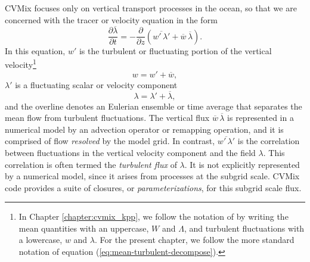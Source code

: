 CVMix focuses only on vertical transport processes in the ocean, so
that we are concerned with the tracer or velocity equation in the form
\begin{equation}
  \frac{\partial \overline{\lambda} }{\partial t}  = 
 - \frac{\partial}{\partial z}  \left( \overline{w' \, \lambda'} + \overline{w} \, \overline{\lambda} \right). 
\end{equation}
In this equation, $w'$ is the turbulent or fluctuating portion of the
vertical velocity\footnote{In Chapter \ref{chapter:cvmix_kpp}, we
  follow the notation of \cite{LargeKPP} by writing the mean
  quantities with an uppercase, $W$ and $\Lambda$, and turbulent
  fluctuations with a lowercase, $w$ and $\lambda$. For the present
  chapter, we follow the more standard notation of equation
  (\ref{eq:mean-turbulent-decompose}).}
\begin{equation}
 w = w' + \overline{w},
\label{eq:mean-turbulent-decompose-w}
\end{equation}
$\lambda'$ is a fluctuating scalar or velocity component
\begin{equation}
 \lambda = \lambda' + \overline{\lambda},
\label{eq:mean-turbulent-decompose-lambda}
\end{equation}
and the overline denotes an Eulerian ensemble or time average that
separates the mean flow from turbulent fluctuations.  The vertical
flux $\overline{w} \, \overline{\lambda}$ is represented in a
numerical model by an advection operator or remapping operation, and
it is comprised of flow {\it resolved} by the model grid.  In
contrast, $\overline{w' \, \lambda'}$ is the correlation between
fluctuations in the vertical velocity component and the field
$\lambda$. This correlation is often termed the {\it turbulent flux}
of $\lambda$.  It is not explicitly represented by a numerical model,
since it arises from processes at the subgrid scale.  CVMix code
provides a suite of closures, or {\it parameterizations}, for this
subgrid scale flux.

